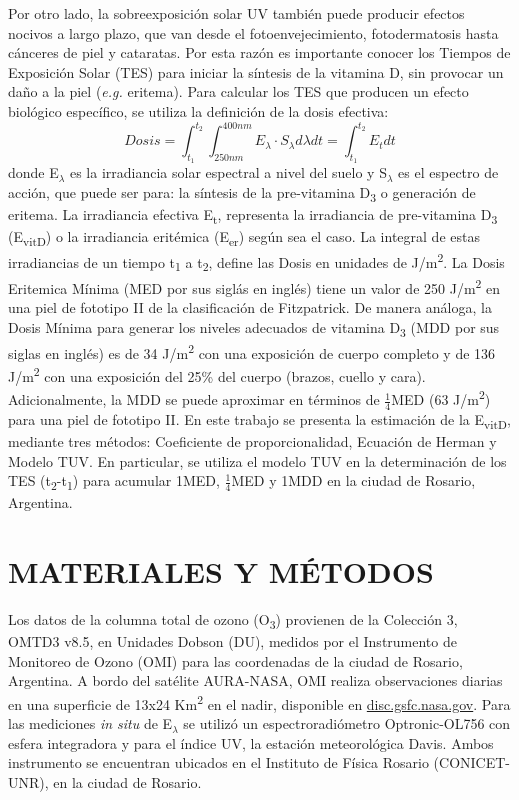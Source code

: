 \documentclass[10pt,twocolumn]{article}
\begin{document}
Por otro lado, la sobreexposición solar UV también puede producir efectos nocivos a largo plazo, que van desde el fotoenvejecimiento, fotodermatosis hasta cánceres de piel y cataratas.\cite{Gilaberte2011,Modenese2016} Por esta razón es importante conocer los Tiempos de Exposición Solar (TES) para iniciar la síntesis de la vitamina D, sin provocar un daño a la piel (\emph{e.g.} eritema). Para calcular los TES que producen un efecto biológico específico, se utiliza la definición de la dosis efectiva:
\begin{equation}
  Dosis=\int_{t_1}^{t_2} \int_{250nm}^{400nm} E_\lambda\cdot S_\lambda d\lambda dt = \int_{t_1}^{t_2}E_tdt \label{eq:dosis}
\end{equation}
donde E$_\lambda$ es la irradiancia solar espectral a nivel del suelo y S$_\lambda$ es el espectro de acción, que puede ser para: la síntesis de la pre-vitamina D\textsubscript{3} o generación de eritema. La irradiancia efectiva E\textsubscript{t}, representa la irradiancia de pre-vitamina D\textsubscript{3} (E\textsubscript{vitD}) o la irradiancia eritémica (E\textsubscript{er}) según sea el caso. La integral de estas irradiancias de un tiempo t\textsubscript{1} a t\textsubscript{2}, define las Dosis en unidades de J/m\textsuperscript{2}.
La Dosis Eritemica Mínima (MED por sus siglás en inglés) tiene un valor de 250 J/m\textsuperscript{2} en una piel de fototipo II de la clasificación de Fitzpatrick.\cite{Fitzpatrick1988} De manera análoga, la Dosis Mínima para generar los niveles adecuados de vitamina D\textsubscript{3} (MDD por sus siglas en inglés) es de 34 J/m\textsuperscript{2} con una exposición de cuerpo completo y de 136 J/m\textsuperscript{2} con una exposición del 25\% del cuerpo (brazos, cuello y cara).\cite{UVDoses, Fioletov_2010} Adicionalmente, la MDD se puede aproximar en términos de $\frac{1}{4}$MED (63 J/m\textsuperscript{2}) para una piel de fototipo II\cite{Dowdy_2010}. En este trabajo se presenta la estimación de la E\textsubscript{vitD}, mediante tres métodos: Coeficiente de proporcionalidad,\cite{UVDoses} Ecuación de Herman\cite{Herman2010} y Modelo TUV.\cite{Madronich1987} En particular, se utiliza el modelo TUV en la determinación de los TES (t\textsubscript{2}-t\textsubscript{1}) para acumular 1MED, $\frac{1}{4}$MED y 1MDD en la ciudad de Rosario, Argentina.

\section{MATERIALES Y MÉTODOS}
Los datos de la columna total de ozono (O\textsubscript{3}) provienen de la Colección 3, OMTD3 v8.5, en Unidades Dobson (DU), medidos por el Instrumento de Monitoreo de Ozono (OMI) para las coordenadas de la ciudad de Rosario, Argentina. A bordo del satélite AURA-NASA, OMI realiza observaciones diarias en una superficie de 13x24 Km\textsuperscript{2} en el nadir, disponible en \href{(disc.gsfc.nasa.gov)}{\url{disc.gsfc.nasa.gov}}. Para las mediciones \emph{in situ} de E$_\lambda$ se utilizó un espectroradiómetro Optronic-OL756 con esfera integradora y para el índice UV, la estación meteorológica Davis. Ambos instrumento se encuentran ubicados en el Instituto de Física Rosario (CONICET-UNR), en la ciudad de Rosario.
\end{document}
